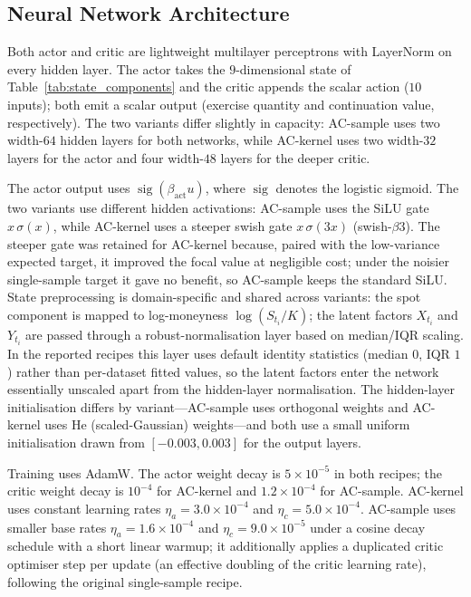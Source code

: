 \documentclass[a4paper,fleqn]{cas-dc}
\begin{document}
\subsection{Neural Network Architecture}
\label{sec:architecture}

Both actor and critic are lightweight multilayer perceptrons with LayerNorm on every hidden layer. The actor takes the $9$-dimensional state of Table~\ref{tab:state_components} and the critic appends the scalar action ($10$ inputs); both emit a scalar output (exercise quantity and continuation value, respectively). The two variants differ slightly in capacity: AC-sample uses two width-$64$ hidden layers for both networks, while AC-kernel uses two width-$32$ layers for the actor and four width-$48$ layers for the deeper critic.

The actor output uses $\operatorname{sig}(\beta_{\mathrm{act}} u)$, where $\operatorname{sig}$ denotes the logistic sigmoid. The two variants use different hidden activations: AC-sample uses the SiLU gate $x\,\sigma(x)$, while AC-kernel uses a steeper swish gate $x\,\sigma(3x)$ (swish-$\beta$3). The steeper gate was retained for AC-kernel because, paired with the low-variance expected target, it improved the focal value at negligible cost; under the noisier single-sample target it gave no benefit, so AC-sample keeps the standard SiLU. State preprocessing is domain-specific and shared across variants: the spot component is mapped to log-moneyness $\log(S_{t_i}/K)$; the latent factors $X_{t_i}$ and $Y_{t_i}$ are passed through a robust-normalisation layer based on median/IQR scaling. In the reported recipes this layer uses default identity statistics (median $0$, IQR $1$) rather than per-dataset fitted values, so the latent factors enter the network essentially unscaled apart from the hidden-layer normalisation. The hidden-layer initialisation differs by variant---AC-sample uses orthogonal weights and AC-kernel uses He (scaled-Gaussian) weights---and both use a small uniform initialisation drawn from $[-0.003,0.003]$ for the output layers.

Training uses AdamW. The actor weight decay is $5 \times 10^{-5}$ in both recipes; the critic weight decay is $10^{-4}$ for AC-kernel and $1.2 \times 10^{-4}$ for AC-sample. AC-kernel uses constant learning rates $\eta_a = 3.0 \times 10^{-4}$ and $\eta_c = 5.0 \times 10^{-4}$. AC-sample uses smaller base rates $\eta_a = 1.6 \times 10^{-4}$ and $\eta_c = 9.0 \times 10^{-5}$ under a cosine decay schedule with a short linear warmup; it additionally applies a duplicated critic optimiser step per update (an effective doubling of the critic learning rate), following the original single-sample recipe.
\end{document}
